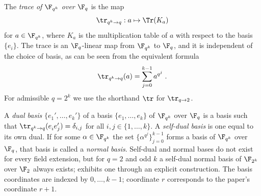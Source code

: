 \begin{definition}\label{def:subfield-trace}
	The \emph{trace of $\F_{q^k}$ over $\F_q$} is the map
	\begin{equation}\label{eq:def-trace}
		\tr_{q^k \to q} : a \mapsto \Tr(K_a)
	\end{equation}
	for $a \in \F_{q^k}$, where $K_a$ is the multiplication table of $a$ with
	respect to the basis $\{e_i\}$. The trace is an $\F_q$-linear map from
	$\F_{q^k}$ to $\F_q$, and it is independent of the choice of basis, as can
	be seen from the equivalent formula
	\[
		\tr_{q^k \to q}(a) = \sum_{j=0}^{k-1} a^{q^j}\;.
	\]
	For admissible $q = 2^k$ we use the shorthand $\tr$ for $\tr_{q \to 2}$.
\end{definition}

\begin{definition}\label{def:dual-self-dual-normal-basis}
	\leanok
	A \emph{dual basis} $\{e_1', \dots, e_k'\}$ of a basis
	$\{e_1, \dots, e_k\}$ of $\F_{q^k}$ over $\F_q$ is a basis such that
	$\tr_{q^k \to q}(e^{}_i e'_j) = \delta_{i,j}$ for all
	$i, j \in \{1, \dots, k\}$. A \emph{self-dual basis} is one equal to its own
	dual. If for some $\alpha \in \F_{q^k}$ the set
	$\{\alpha^{q^j}\}_{j=0}^{k-1}$ forms a basis of $\F_{q^k}$ over $\F_q$, that
	basis is called a \emph{normal basis}. Self-dual and normal bases do not
	exist for every field extension, but for $q = 2$ and odd $k$ a self-dual
	normal basis of $\F_{2^k}$ over $\F_2$ always exists; \cite{Ji2020MIPStar}
	exhibits one through an explicit construction.
	The basis coordinates are indexed by $0,\ldots,k-1$; coordinate $r$
	corresponds to the paper's coordinate $r+1$.
\end{definition}

